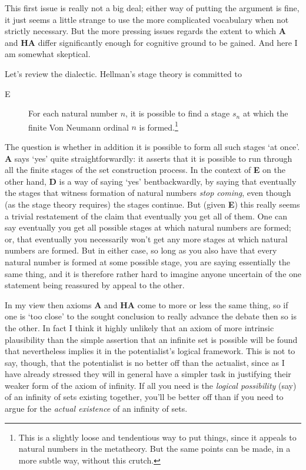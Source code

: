 \documentclass{amsart}
\theoremstyle{definition}
\begin{document}
This first issue is really not a big deal; either way of putting the argument
is fine, it just seems a little strange to use the more complicated 
vocabulary when not strictly necessary. But the more pressing issues
regards the extent to which {\bf A} and {\bf HA} differ significantly 
enough for cognitive ground to be gained. And here I am somewhat skeptical.

Let's review the dialectic. Hellman's stage theory is committed to 

\begin{description} 
    \item[E] For each natural number $n$, 
    it is possible to find a stage $s_n$ at which the 
    finite Von Neumann ordinal $n$ is formed.\footnote{
        This is a slightly loose and tendentious way to put things,
        since it appeals to natural numbers in the metatheory. But
        the same points can be made, in a more subtle way, without
        this crutch.
    }
\end{description} 
The question is whether in addition it is possible to form 
all such stages `at once'. {\bf A} says `yes' quite straightforwardly: 
it asserts that it is possible to run through all the finite stages 
of the set construction process. In the context of {\bf E} on the other hand, 
{\bf D} is a way of saying `yes' bentbackwardly, by saying that eventually 
the stages that witness formation of natural numbers \emph{stop coming}, 
even though (as the stage theory requires) the stages continue. 
But (given {\bf E}) this really seems a trivial restatement of the 
claim that eventually you get all of them.  One can say eventually you get 
all possible stages at which natural numbers 
are formed; or, that eventually you necessarily won't get any more stages at which natural 
numbers are formed. But in either case,
so long as you also have that every natural 
number is formed at some possible stage,
you are saying essentially the same thing, and it is therefore rather 
hard to imagine anyone uncertain of the one statement being 
reassured by appeal to the other.

In my view then axioms {\bf A} and {\bf HA} come to more or less the 
same thing, so if one is `too close' to the sought conclusion to really advance 
the debate then so is the other. In fact I think it highly unlikely that an axiom 
of more intrinsic plausibility than the simple assertion that an infinite set is possible 
will be found that nevertheless implies it in the potentialist's logical framework.  
This is not to say, though, that the potentialist is no better off than the actualist, 
since as I have already stressed they will in general have a simpler task in justifying 
their weaker form of the axiom of infinity. If all you need is the \emph{logical possibility}
(say) of an infinity of sets existing together, you'll be better off than if you 
need to argue for the \emph{actual existence} of an infinity of sets.
\end{document}
